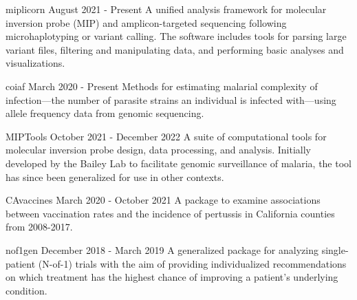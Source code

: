 
\begin{cvprojects}

  \cvproject
    {miplicorn} %
    {August 2021 - Present} %
    {A unified analysis framework for molecular inversion probe (MIP) and
    amplicon-targeted sequencing following microhaplotyping or variant calling. 
    The software includes tools for parsing large variant files, filtering and 
    manipulating data, and performing basic analyses and visualizations.}

  \cvproject
    {coiaf} %
    {March 2020 - Present} %
    {Methods for estimating malarial complexity of infection—the
    number of parasite strains an individual is infected with—using allele
    frequency data from genomic sequencing.} %

  \cvproject
    {MIPTools}
    {October 2021 - December 2022}
    {A suite of computational tools for molecular inversion probe design, data
    processing, and analysis. Initially developed by the Bailey Lab to
    facilitate genomic surveillance of malaria, the tool has since been
    generalized for use in other contexts.}

  \cvproject
    {CAvaccines}
    {March 2020 - October 2021}
    {A package to examine associations between vaccination rates and the
    incidence of pertussis in California counties from 2008-2017.}

  \cvproject
    {nof1gen}
      {December 2018 - March 2019}
      {A generalized package for analyzing single-patient (N-of-1) trials with
      the aim of providing individualized recommendations on which treatment has
      the highest chance of improving a patient's underlying condition.}

\end{cvprojects}
